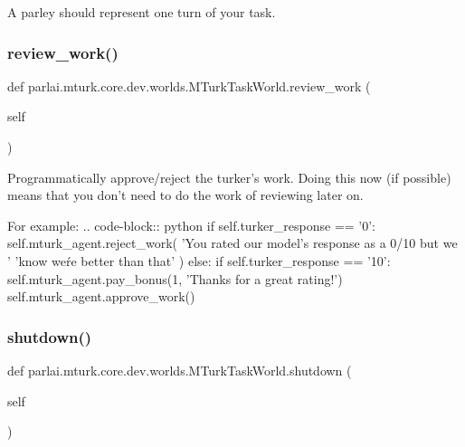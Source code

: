 \begin{DoxyVerb}A parley should represent one turn of your task.
\end{DoxyVerb}
 \mbox{\label{classparlai_1_1mturk_1_1core_1_1dev_1_1worlds_1_1MTurkTaskWorld_a9128507c0a4ae977faf779690462ab37}} 
\subsubsection{\texorpdfstring{review\+\_\+work()}{review\_work()}}
{\footnotesize\ttfamily def parlai.\+mturk.\+core.\+dev.\+worlds.\+M\+Turk\+Task\+World.\+review\+\_\+work (\begin{DoxyParamCaption}\item[{}]{self }\end{DoxyParamCaption})}

\begin{DoxyVerb}Programmatically approve/reject the turker's work. Doing this now (if possible)
means that you don't need to do the work of reviewing later on.

For example:
.. code-block:: python
    if self.turker_response == '0':
self.mturk_agent.reject_work(
    'You rated our model's response as a 0/10 but we '
    'know we\'re better than that'
)
    else:
if self.turker_response == '10':
    self.mturk_agent.pay_bonus(1, 'Thanks for a great rating!')
self.mturk_agent.approve_work()
\end{DoxyVerb}
 \mbox{\label{classparlai_1_1mturk_1_1core_1_1dev_1_1worlds_1_1MTurkTaskWorld_a1948a7ac9d8baad030c239c97aba747b}} 
\subsubsection{\texorpdfstring{shutdown()}{shutdown()}}
{\footnotesize\ttfamily def parlai.\+mturk.\+core.\+dev.\+worlds.\+M\+Turk\+Task\+World.\+shutdown (\begin{DoxyParamCaption}\item[{}]{self }\end{DoxyParamCaption})}

